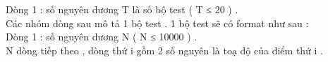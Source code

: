 Dòng 1 : số nguyên dương T là số bộ test ( T ≤ 20 ) .   
\\   Các nhóm dòng sau mô tả 1 bộ test . 1 bộ test sẽ có format như sau :   
\\   Dòng 1 : số nguyên dương N (  N ≤ 10000 ) .   
\\   N dòng tiếp theo , dòng thứ i gồm 2 số nguyên là toạ độ của điểm thứ i .  

\